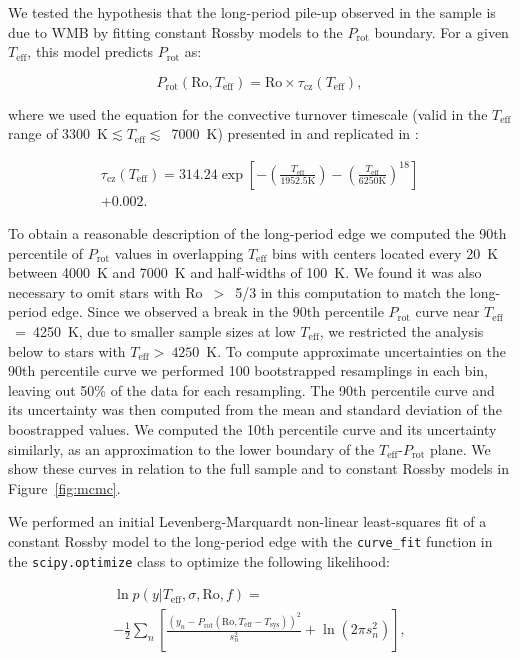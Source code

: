 \documentclass[trackchanges,twocolumn]{aastex631}
\newcommand{\lamostmcq}{LAMOST--McQuillan\xspace}
\newcommand{\teff}{\ensuremath{T_{\mathrm{eff}}}\xspace}
\newcommand{\prot}{\ensuremath{P_\mathrm{rot}}\xspace}
\begin{document}
We tested the hypothesis that the long-period pile-up observed in the \edit1{\lamostmcq} sample is due to WMB by fitting constant Rossby models to the \prot boundary. For a given \teff, this model predicts \prot as: 

\begin{equation} \label{eq:1}
    \prot (\mathrm{Ro}, \teff) = \mathrm{Ro} \times \tau_\mathrm{cz}(\teff),
\end{equation}

where we used the equation for the convective turnover timescale (valid in the \teff range of 3300~K$\lesssim \teff \lesssim$~7000~K) presented in \citet{Gunn1998} and replicated in \citet{CranmerSaar2011}:

\begin{multline} \label{eq:2}
\tau_\mathrm{cz}(\teff) = 314.24\exp \left [ -\left (\frac{T_\mathrm{eff}}{1952.5 \mathrm{K}}  \right ) - \left (\frac{T_\mathrm{eff}}{6250 \mathrm{K}}  \right )^{18} \right ] \\+ 0.002.
\end{multline}

To obtain a reasonable description of the long-period edge we computed the 90th percentile of \prot values in overlapping \teff bins with centers located every 20~K between 4000~K and 7000~K and half-widths of 100~K. We found it was also necessary to omit stars with Ro~$>$~5/3 in this computation to match the long-period edge. Since we observed a break in the 90th percentile \prot curve near \teff~=~4250~K, due to smaller sample sizes at low \teff, we restricted the analysis below to stars with \teff$>~4250$~K. To compute approximate uncertainties on the 90th percentile curve we performed 100 bootstrapped resamplings in each bin, leaving out 50\% of the data for each resampling. The 90th percentile curve and its uncertainty was then computed from the mean and standard deviation of the boostrapped values. We computed the 10th percentile curve and its uncertainty similarly, as an approximation to the lower boundary of the \teff-\prot plane. We show these curves in relation to the full \edit1{\lamostmcq} sample and to constant Rossby models in Figure~\ref{fig:mcmc}.

We performed an initial Levenberg-Marquardt non-linear least-squares fit of a constant Rossby model to the long-period edge with the \texttt{curve\_fit} function in the \texttt{scipy.optimize} class to optimize the following likelihood: 

\begin{multline} \label{eq:3}
    \ln{p} (y | T_\mathrm{eff}, \sigma, \mathrm{Ro}, f) =\\ -\frac{1}{2}\sum_n \left [ \frac{(y_n - P_\mathrm{rot}(\mathrm{Ro}, T_\mathrm{eff} - T_\mathrm{sys}))^2}{s_n^2}  + \ln{(2\pi s_n^2)} \right ],
\end{multline}
\end{document}
